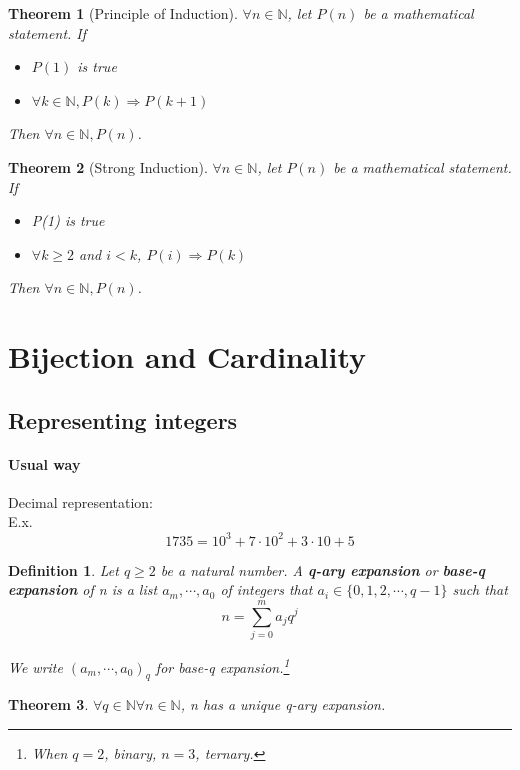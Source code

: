 \documentclass[12pt]{article}
\newtheorem{definition}{Definition}[subsection]
\newtheorem{theorem}{Theorem}[subsection]
\begin{document}
	\begin{theorem}[Principle of Induction]
		$\forall n \in \mathbb{N}$, let $P(n)$ be a mathematical statement. If
		\begin{itemize}
			\item $P(1)$ is true 
			\item $\forall k \in \mathbb{N}, P(k) \Rightarrow P(k+1)$
		\end{itemize}
Then $\forall n \in \mathbb{N}, P(n)$.
	\end{theorem}
	
	\begin{theorem}[Strong Induction]
		$\forall n \in \mathbb{N}$, let $P(n)$ be a mathematical statement. If
		\begin{itemize}
			\item P(1) is true 
			\item $\forall k \geq 2$ and $i < k$, $P(i) \Rightarrow P(k)$ 
		\end{itemize}
		Then $\forall n \in \mathbb{N}, P(n)$.
	\end{theorem}
	
	\section{Bijection and Cardinality}
		\subsection{Representing integers}
		\paragraph{Usual way} Decimal representation:\\
		E.x.\[1735 = 10^3 + 7 \cdot 10^2 + 3 \cdot 10 + 5\]
		\begin{definition}
			Let $q \geq 2$ be a natural number. A \textbf{q-ary expansion} or \textbf{base-q expansion} of n is a list $a_m,\cdots, a_0$ of integers that $a_i \in \{0, 1, 2, \cdots, q-1\}$ such that \[n = \sum_{j = 0}^m a_jq^j\]
			
				We write $(a_m,\cdots, a_0)_{q}$ for base-q expansion.\footnote{When $q = 2$, binary, $n = 3$, ternary.}
		\end{definition}
		
		\begin{theorem}
			$\forall q \in \mathbb{N} \forall n \in \mathbb{N}$, n has a unique q-ary expansion. 
		\end{theorem}
		
\end{document}
